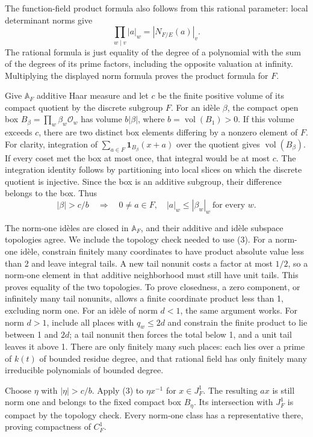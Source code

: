 \documentclass[11pt,a4paper]{article}
\begin{document}
The function-field product formula also follows from this rational
parameter: local determinant norms give \[
\prod_{w\mid v}|a|_w=|N_{F/E}(a)|_v.
\] The rational formula is just equality of the degree of a polynomial
with the sum of the degrees of its prime factors, including the opposite
valuation at infinity. Multiplying the displayed norm formula proves the
product formula for \(F\).

Give \(\mathbb A_F\) additive Haar measure and let \(c\) be the finite
positive volume of its compact quotient by the discrete subgroup \(F\).
For an idèle \(\beta\), the compact open box
\(B_\beta=\prod_w\beta_w\mathcal O_w\) has volume \(b|\beta|\), where
\(b=\operatorname{vol}(B_1)>0\). If this volume exceeds \(c\), there are
two distinct box elements differing by a nonzero element of \(F\). For
clarity, integration of \(\sum_{a\in F}\mathbf1_{B_\beta}(x+a)\) over
the quotient gives \(\operatorname{vol}(B_\beta)\). If every coset met
the box at most once, that integral would be at most \(c\). The
integration identity follows by partitioning into local slices on which
the discrete quotient is injective. Since the box is an additive
subgroup, their difference belongs to the box. Thus \[
|\beta|>c/b\quad\Longrightarrow\quad
0\ne a\in F,\quad |a|_w\leq|\beta_w|_w\ \text{for every }w.
\tag{3}
\]

The norm-one idèles are closed in \(\mathbb A_F\), and their additive
and idèle subspace topologies agree. We include the topology check
needed to use (3). For a norm-one idèle, constrain finitely many
coordinates to have product absolute value less than 2 and leave
integral tails. A new tail nonunit costs a factor at most \(1/2\), so a
norm-one element in that additive neighborhood must still have unit
tails. This proves equality of the two topologies. To prove closedness,
a zero component, or infinitely many tail nonunits, allows a finite
coordinate product less than 1, excluding norm one. For an idèle of norm
\(d<1\), the same argument works. For norm \(d>1\), include all places
with \(q_w\leq2d\) and constrain the finite product to lie between 1 and
\(2d\); a tail nonunit then forces the total below 1, and a unit tail
leaves it above 1. There are only finitely many such places: each lies
over a prime of \(k(t)\) of bounded residue degree, and that rational
field has only finitely many irreducible polynomials of bounded degree.

Choose \(\eta\) with \(|\eta|>c/b\). Apply (3) to \(\eta x^{-1}\) for
\(x\in J_F^1\). The resulting \(a x\) is still norm one and belongs to
the fixed compact box \(B_\eta\). Its intersection with \(J_F^1\) is
compact by the topology check. Every norm-one class has a representative
there, proving compactness of \(C_F^1\).
\end{document}
